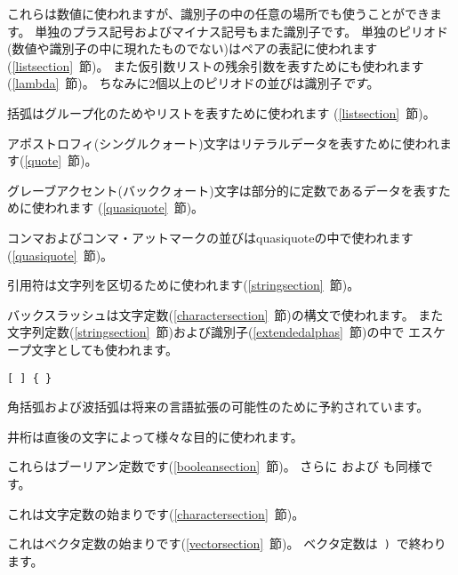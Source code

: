 \begin{description}{}{}

\item[{\tt.\ + -}]
これらは数値に使われますが、識別子の中の任意の場所でも使うことができます。
単独のプラス記号およびマイナス記号もまた識別子です。
単独のピリオド(数値や識別子の中に現れたものでない)はペアの表記に使われます(\ref{listsection}~節)。
また仮引数リストの残余引数を表すためにも使われます(\ref{lambda}~節)。
ちなみに2個以上のピリオドの並びは識別子{\em です}。

\item[\tt( )]
括弧はグループ化のためやリストを表すために使われます
(\ref{listsection}~節)。

\item[\singlequote]
アポストロフィ(シングルクォート)文字はリテラルデータを表すために使われます(\ref{quote}~節)。

\item[\backquote]
グレーブアクセント(バッククォート)文字は部分的に定数であるデータを表すために使われます
(\ref{quasiquote}~節)。

\item[\tt, ,@]
コンマおよびコンマ・アットマークの並びはquasiquoteの中で使われます(\ref{quasiquote}~節)。

\item[\tt"]
引用符は文字列を区切るために使われます(\ref{stringsection}~節)。

\item[\backwhack]
バックスラッシュは文字定数(\ref{charactersection}~節)の構文で使われます。
また文字列定数(\ref{stringsection}~節)および識別子(\ref{extendedalphas}~節)の中で
エスケープ文字としても使われます。

\hbox{\tt \verb"[" \verb"]" \verb"{" \verb"}"}
\item[\copy0]
角括弧および波括弧は将来の言語拡張の可能性のために予約されています。

\item[\sharpsign]
井桁は直後の文字によって様々な目的に使われます。

\item[\schtrue{} \schfalse{}]
これらはブーリアン定数です(\ref{booleansection}~節)。
さらに および も同様です。

\item[\sharpsign\backwhack]
これは文字定数の始まりです(\ref{charactersection}~節)。

\item[\sharpsign\tt(]
これはベクタ定数の始まりです(\ref{vectorsection}~節)。
ベクタ定数は~{\tt)}~で終わります。


\end{description}
